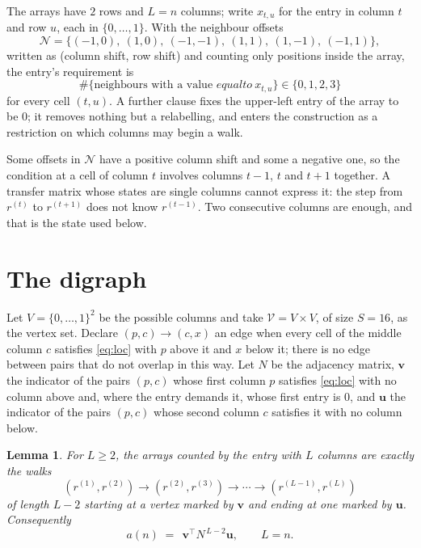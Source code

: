 \documentclass[11pt,a4paper]{article}
\theoremstyle{plain}
\newtheorem{lemma}[theorem]{Lemma}
\theoremstyle{definition}
\begin{document}
The arrays have $2$ rows and $L=n$ columns; write $x_{t,u}$ for the entry in
column $t$ and row $u$, each in $\{0,\dots,1\}$. With the neighbour offsets
\[
\mathcal N=\{(-1,0),\ (1,0),\ (-1,-1),\ (1,1),\ (1,-1),\ (-1,1)\},
\]
written as (column shift, row shift) and counting only positions inside the array, the
entry's requirement is
\begin{equation}\label{eq:loc}
\#\{\text{neighbours with a value }equal to\ x_{t,u}\}\in\{0,1,2,3\}
\end{equation}
for every cell $(t,u)$. A further clause fixes the upper-left entry of the array to be $0$; it removes nothing but a relabelling, and enters the construction as a restriction on which columns may begin a walk.

Some offsets in $\mathcal N$ have a positive column shift and some a negative one, so the
condition at a cell of column $t$ involves columns $t-1$, $t$ and $t+1$ together. A transfer
matrix whose states are single columns cannot express it: the step from $r^{(t)}$ to
$r^{(t+1)}$ does not know $r^{(t-1)}$. Two consecutive columns are enough, and that is
the state used below.

\section{The digraph}

Let $V=\{0,\dots,1\}^{2}$ be the possible columns and take
$\mathcal V=V\times V$, of size $S=16$, as the vertex set. Declare $(p,c)\to(c,x)$ an edge
when every cell of the middle column $c$ satisfies \eqref{eq:loc} with $p$ above it and $x$
below it; there is no edge between pairs that do not overlap in this way. Let $N$ be the
adjacency matrix, $\mathbf{v}$ the indicator of the pairs $(p,c)$ whose first column $p$
satisfies \eqref{eq:loc} with no column above and, where the entry demands it, whose first entry is $0$, and $\mathbf{u}$ the indicator of
the pairs $(p,c)$ whose second column $c$ satisfies it with no column below.

\begin{lemma}\label{lem:walk}
For $L\ge2$, the arrays counted by the entry with $L$ columns are exactly the walks
\[
(r^{(1)},r^{(2)})\to(r^{(2)},r^{(3)})\to\cdots\to(r^{(L-1)},r^{(L)})
\]
of length $L-2$ starting at a vertex marked by $\mathbf{v}$ and ending at one marked by
$\mathbf{u}$. Consequently
\[
a(n)\;=\;\,\mathbf{v}^{\!\top}N^{\,L-2}\mathbf{u},\qquad L=n .
\]
\end{lemma}
\end{document}
